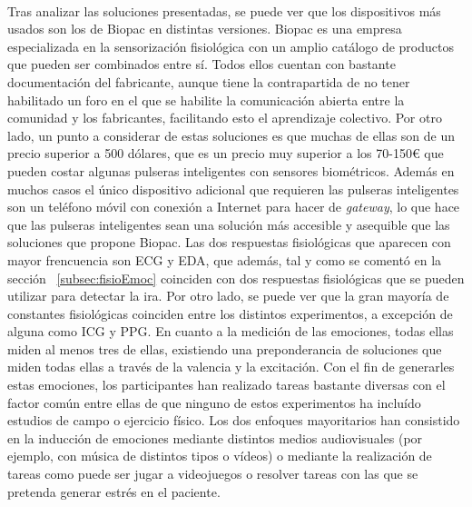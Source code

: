 \paragraph{}
Tras analizar las soluciones presentadas, se puede ver que los dispositivos más usados son los de Biopac en distintas versiones. Biopac es una empresa especializada en la sensorización fisiológica con un amplio catálogo de productos que pueden ser combinados entre sí. Todos ellos cuentan con bastante documentación del fabricante, aunque tiene la contrapartida de no tener habilitado un foro en el que se habilite la comunicación abierta entre la comunidad y los fabricantes, facilitando esto el aprendizaje colectivo. Por otro lado, un punto a considerar de estas soluciones es que muchas de ellas son de un precio superior a 500 dólares, que es un precio muy superior a los 70-150€ que pueden costar algunas pulseras inteligentes con sensores biométricos. Además en muchos casos el único dispositivo adicional que requieren las pulseras inteligentes son un teléfono móvil con conexión a Internet para hacer de \textit{gateway}, lo que hace que las pulseras inteligentes sean una solución más accesible y asequible que las soluciones que propone Biopac. Las dos respuestas fisiológicas que aparecen con mayor frencuencia son ECG y EDA, que además, tal y como se comentó en la sección ~\ref{subsec:fisioEmoc} coinciden con dos respuestas fisiológicas que se pueden utilizar para detectar la ira. Por otro lado, se puede ver que la gran mayoría de constantes fisiológicas coinciden entre los distintos experimentos, a excepción de alguna como ICG y PPG. En cuanto a la medición de las emociones, todas ellas miden al menos tres de ellas, existiendo una preponderancia de soluciones que miden todas ellas a través de la valencia y la excitación. Con el fin de generarles estas emociones, los participantes han realizado tareas bastante diversas con el factor común entre ellas de que ninguno de estos experimentos ha incluído estudios de campo o ejercicio físico. Los dos enfoques mayoritarios han consistido en la inducción de emociones mediante distintos medios audiovisuales (por ejemplo, con música de distintos tipos o vídeos) o mediante la realización de tareas como puede ser jugar a videojuegos o resolver tareas con las que se pretenda generar estrés en el paciente.

